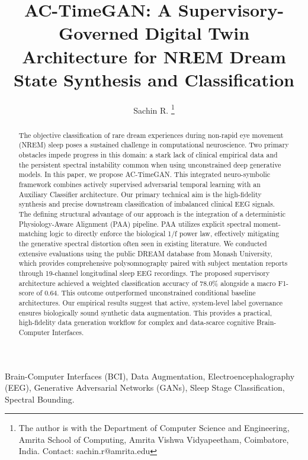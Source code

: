 \documentclass[journal,10pt,twocolumn]{IEEEtran}
\begin{document}
\title{AC-TimeGAN: A Supervisory-Governed Digital Twin Architecture for NREM Dream State Synthesis and Classification}

\author{Sachin R.
\thanks{The author is with the Department of Computer Science and Engineering, Amrita School of Computing, Amrita Vishwa Vidyapeetham, Coimbatore, India. Contact: sachin.r@amrita.edu}
}

\maketitle

\begin{abstract}
The objective classification of rare dream experiences during non-rapid eye movement (NREM) sleep poses a sustained challenge in computational neuroscience. Two primary obstacles impede progress in this domain: a stark lack of clinical empirical data and the persistent spectral instability common when using unconstrained deep generative models. In this paper, we propose AC-TimeGAN. This integrated neuro-symbolic framework combines actively supervised adversarial temporal learning with an Auxiliary Classifier architecture. Our primary technical aim is the high-fidelity synthesis and precise downstream classification of imbalanced clinical EEG signals. The defining structural advantage of our approach is the integration of a deterministic Physiology-Aware Alignment (PAA) pipeline. PAA utilizes explicit spectral moment-matching logic to directly enforce the biological 1/f power law, effectively mitigating the generative spectral distortion often seen in existing literature. We conducted extensive evaluations using the public DREAM database from Monash University, which provides comprehensive polysomnography paired with subject mentation reports through 19-channel longitudinal sleep EEG recordings. The proposed supervisory architecture achieved a weighted classification accuracy of 78.0\% alongside a macro F1-score of 0.64. This outcome outperformed unconstrained conditional baseline architectures. Our empirical results suggest that active, system-level label governance ensures biologically sound synthetic data augmentation. This provides a practical, high-fidelity data generation workflow for complex and data-scarce cognitive Brain-Computer Interfaces.
\end{abstract}

\begin{IEEEkeywords}
Brain-Computer Interfaces (BCI), Data Augmentation, Electroencephalography (EEG), Generative Adversarial Networks (GANs), Sleep Stage Classification, Spectral Bounding.
\end{IEEEkeywords}
\end{document}
